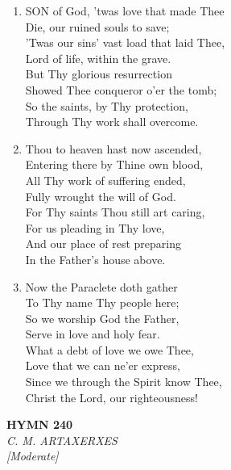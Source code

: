 \documentclass[11pt,a4paper]{article}
\begin{document}
\begin{enumerate}
    \item SON of God, 'twas love that made Thee \\
            Die, our ruined souls to save; \\
        'Twas our sins' vast load that laid Thee, \\
            Lord of life, within the grave. \\
        But Thy glorious resurrection \\
            Showed Thee conqueror o'er the tomb; \\
        So the saints, by Thy protection, \\
            Through Thy work shall overcome.

    \item Thou to heaven hast now ascended, \\
            Entering there by Thine own blood, \\
        All Thy work of suffering ended, \\
            Fully wrought the will of God. \\
        For Thy saints Thou still art caring, \\
            For us pleading in Thy love, \\
        And our place of rest preparing \\
            In the Father's house above.

    \item Now the Paraclete doth gather \\
            To Thy name Thy people here; \\
        So we worship God the Father, \\
            Serve in love and holy fear. \\
        What a debt of love we owe Thee, \\
            Love that we can ne'er express, \\
        Since we through the Spirit know Thee, \\
            Christ the Lord, our righteousness!

\end{enumerate}

\newpage
\begin{center}
    {\Large \textbf{HYMN 240}}
    \\
    \textit{C. M. ARTAXERXES}
    \\
    \textit{\small [Moderate]}
\end{center}
\vspace{1em}
\end{document}

